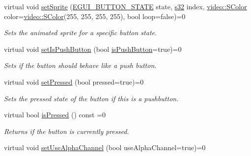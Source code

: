\begin{DoxyCompactItemize}
virtual void \hyperlink{classirr_1_1gui_1_1IGUIButton_a26c5f05e922b0fc1b5790a001fd04b78}{set\+Sprite} (\hyperlink{namespaceirr_1_1gui_a2520445dec46e00684645ef8053aebb5}{E\+G\+U\+I\+\_\+\+B\+U\+T\+T\+O\+N\+\_\+\+S\+T\+A\+TE} state, \hyperlink{namespaceirr_ac66849b7a6ed16e30ebede579f9b47c6}{s32} index, \hyperlink{classirr_1_1video_1_1SColor}{video\+::\+S\+Color} color=\hyperlink{classirr_1_1video_1_1SColor}{video\+::\+S\+Color}(255, 255, 255, 255), bool loop=false)=0
\begin{DoxyCompactList}\small\item\em Sets the animated sprite for a specific button state. \end{DoxyCompactList}\item 
virtual void \hyperlink{classirr_1_1gui_1_1IGUIButton_a992775637ba91f5267c4c04d5889fc6d}{set\+Is\+Push\+Button} (bool \hyperlink{classirr_1_1gui_1_1IGUIButton_abb12a92ba70d1fe738655d04ef73734f}{is\+Push\+Button}=true)=0
\begin{DoxyCompactList}\small\item\em Sets if the button should behave like a push button. \end{DoxyCompactList}\item 
\mbox{\label{classirr_1_1gui_1_1IGUIButton_a2508fb292fab222bcebdeae0f9874348}} 
virtual void \hyperlink{classirr_1_1gui_1_1IGUIButton_a2508fb292fab222bcebdeae0f9874348}{set\+Pressed} (bool pressed=true)=0
\begin{DoxyCompactList}\small\item\em Sets the pressed state of the button if this is a pushbutton. \end{DoxyCompactList}\item 
\mbox{\label{classirr_1_1gui_1_1IGUIButton_a2621bd10a5eb91fa14037feb9378c252}} 
virtual bool \hyperlink{classirr_1_1gui_1_1IGUIButton_a2621bd10a5eb91fa14037feb9378c252}{is\+Pressed} () const =0
\begin{DoxyCompactList}\small\item\em Returns if the button is currently pressed. \end{DoxyCompactList}\item 
\mbox{\label{classirr_1_1gui_1_1IGUIButton_a3d7727e7807e8b71dae6f81a44737e8a}} 
virtual void \hyperlink{classirr_1_1gui_1_1IGUIButton_a3d7727e7807e8b71dae6f81a44737e8a}{set\+Use\+Alpha\+Channel} (bool use\+Alpha\+Channel=true)=0

\end{DoxyCompactItemize}
